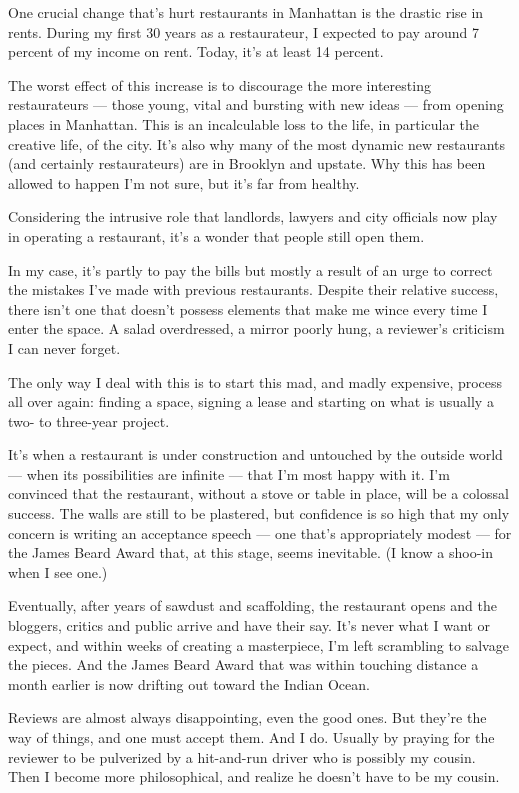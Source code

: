 One crucial change that's hurt restaurants in Manhattan is the drastic
rise in rents. During my first 30 years as a restaurateur, I expected to
pay around 7 percent of my income on rent. Today, it's at least 14
percent.

The worst effect of this increase is to discourage the more interesting
restaurateurs --- those young, vital and bursting with new ideas ---
from opening places in Manhattan. This is an incalculable loss to the
life, in particular the creative life, of the city. It's also why many
of the most dynamic new restaurants (and certainly restaurateurs) are in
Brooklyn and upstate. Why this has been allowed to happen I'm not sure,
but it's far from healthy.

Considering the intrusive role that landlords, lawyers and city
officials now play in operating a restaurant, it's a wonder that people
still open them.

In my case, it's partly to pay the bills but mostly a result of an urge
to correct the mistakes I've made with previous restaurants. Despite
their relative success, there isn't one that doesn't possess elements
that make me wince every time I enter the space. A salad overdressed, a
mirror poorly hung, a reviewer's criticism I can never forget.

The only way I deal with this is to start this mad, and madly expensive,
process all over again: finding a space, signing a lease and starting on
what is usually a two- to three-year project.

It's when a restaurant is under construction and untouched by the
outside world --- when its possibilities are infinite --- that I'm most
happy with it. I'm convinced that the restaurant, without a stove or
table in place, will be a colossal success. The walls are still to be
plastered, but confidence is so high that my only concern is writing an
acceptance speech --- one that's appropriately modest --- for the James
Beard Award that, at this stage, seems inevitable. (I know a shoo-in
when I see one.)

Eventually, after years of sawdust and scaffolding, the restaurant opens
and the bloggers, critics and public arrive and have their say. It's
never what I want or expect, and within weeks of creating a masterpiece,
I'm left scrambling to salvage the pieces. And the James Beard Award
that was within touching distance a month earlier is now drifting out
toward the Indian Ocean.

Reviews are almost always disappointing, even the good ones. But they're
the way of things, and one must accept them. And I do. Usually by
praying for the reviewer to be pulverized by a hit-and-run driver who is
possibly my cousin. Then I become more philosophical, and realize he
doesn't have to be my cousin.

